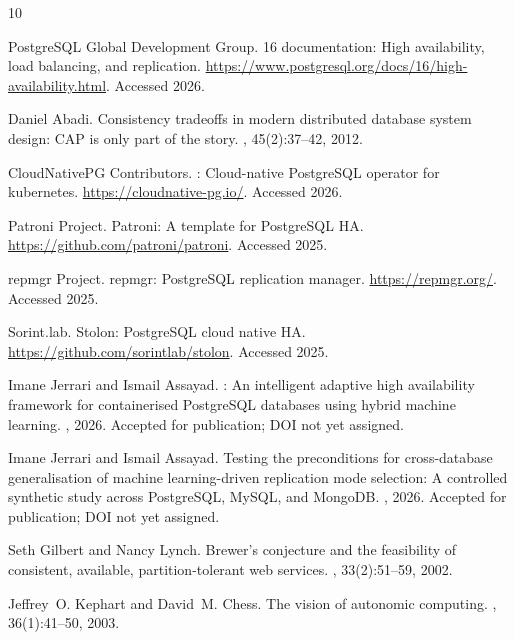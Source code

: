 \documentclass[smallextended]{svjour3}
\begin{document}
\begin{thebibliography}{10}

{PostgreSQL Global Development Group}.
 16 documentation: High availability, load balancing, and
  replication.
\newblock \url{https://www.postgresql.org/docs/16/high-availability.html}.
\newblock Accessed 2026.

Daniel Abadi.
\newblock Consistency tradeoffs in modern distributed database system design:
  {CAP} is only part of the story.
, 45(2):37--42, 2012.

{CloudNativePG Contributors}.
: Cloud-native {PostgreSQL} operator for kubernetes.
\newblock \url{https://cloudnative-pg.io/}.
\newblock Accessed 2026.

{Patroni Project}.
\newblock Patroni: A template for {PostgreSQL} {HA}.
\newblock \url{https://github.com/patroni/patroni}.
\newblock Accessed 2025.

{repmgr Project}.
\newblock repmgr: {PostgreSQL} replication manager.
\newblock \url{https://repmgr.org/}.
\newblock Accessed 2025.

{Sorint.lab}.
\newblock Stolon: {PostgreSQL} cloud native {HA}.
\newblock \url{https://github.com/sorintlab/stolon}.
\newblock Accessed 2025.

Imane Jerrari and Ismail Assayad.
: An intelligent adaptive high availability framework for
  containerised {PostgreSQL} databases using hybrid machine learning.
, 2026.
\newblock Accepted for publication; DOI not yet assigned.

Imane Jerrari and Ismail Assayad.
\newblock Testing the preconditions for cross-database generalisation of
  machine learning-driven replication mode selection: A controlled synthetic
  study across {PostgreSQL}, {MySQL}, and {MongoDB}.
, 2026.
\newblock Accepted for publication; DOI not yet assigned.

Seth Gilbert and Nancy Lynch.
\newblock Brewer's conjecture and the feasibility of consistent, available,
  partition-tolerant web services.
, 33(2):51--59, 2002.

Jeffrey~O. Kephart and David~M. Chess.
\newblock The vision of autonomic computing.
, 36(1):41--50, 2003.


\end{thebibliography}
\end{document}
